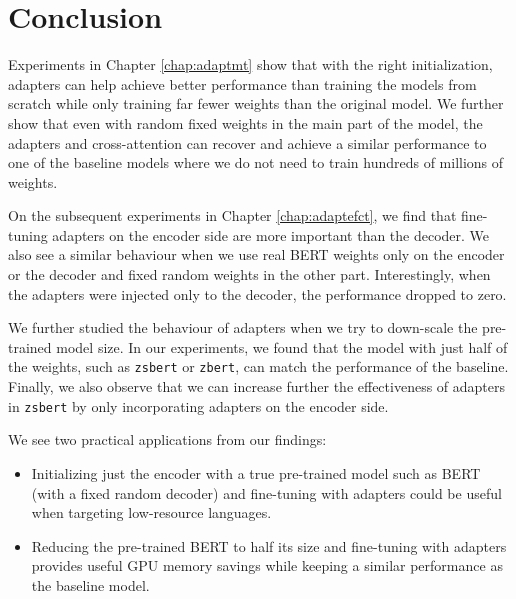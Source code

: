 \chapter*{Conclusion}
Experiments in Chapter \ref{chap:adaptmt} show that with the right initialization, adapters can help achieve better performance than training the models from scratch while only training far fewer weights than the original model. We further show that even with random fixed weights in the main part of the model, the adapters and cross-attention can recover and achieve a similar performance to one of the baseline models where we do not need to train hundreds of millions of weights.

On the subsequent experiments in Chapter \ref{chap:adaptefct}, we find that fine-tuning adapters on the encoder side are more important than the decoder. We also see a similar behaviour when we use real BERT weights only on the encoder or the decoder and fixed random weights in the other part. Interestingly, when the adapters were injected only to the decoder, the performance dropped to zero.

We further studied the behaviour of adapters when we try to down-scale the pre-trained model size. In our experiments, we found that the model with just half of the weights, such as \texttt{zsbert} or \texttt{zbert}, can match the performance of the baseline. Finally, we also observe that we can increase further the effectiveness of adapters in \texttt{zsbert} by only incorporating adapters on the encoder side.

We see two practical applications from our findings:
\begin{itemize}
    \item Initializing just the encoder with a true pre-trained model such as BERT (with a fixed random decoder) and fine-tuning with adapters could be useful when targeting low-resource languages.
    \item Reducing the pre-trained BERT to half its size and fine-tuning with adapters provides useful GPU memory savings while keeping a similar performance as the baseline model.
\end{itemize}